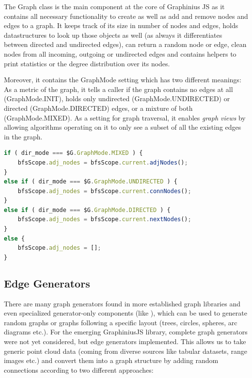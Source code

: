 	The Graph class is the main component at the core of Graphinius JS as it contains all necessary functionality to create as well as add and remove nodes and edges to a graph. It keeps track of its size in number of nodes and edges, holds datastructures to look up those objects as well (as always it differentiates between directed and undirected edges), can return a random node or edge, clean nodes from all incoming, outgoing or undirected edges and contains helpers to print statistics or the degree distribution over its nodes.
	
	Moreover, it contains the GraphMode setting which has two different meanings: As a metric of the graph, it tells a caller if the graph contains no edges at all (GraphMode.INIT), holds only undirected (GraphMode.UNDIRECTED) or directed (GraphMode.DIRECTED) edges, or a mixture of both (GraphMode.MIXED). As a setting for graph traversal, it enables \textit{graph views} by allowing algorithms operating on it to only see a subset of all the existing edges in the graph.
	
	\begin{lstlisting}[caption={Graph traveral dependent on GraphMode.}, label={lst:traversal_mode}, language=JavaScript]
if ( dir_mode === $G.GraphMode.MIXED ) {
	bfsScope.adj_nodes = bfsScope.current.adjNodes();
}
else if ( dir_mode === $G.GraphMode.UNDIRECTED ) {
	bfsScope.adj_nodes = bfsScope.current.connNodes();
}
else if ( dir_mode === $G.GraphMode.DIRECTED ) {
	bfsScope.adj_nodes = bfsScope.current.nextNodes();
}
else {
	bfsScope.adj_nodes = [];
}
	\end{lstlisting}
	
	
	\subsection{Edge Generators}
	\label{ssection: core_}
	
	There are many graph generators found in more established graph libraries and even specialized generator-only components (like \citep{bader2006gtgraph}), which can be used to generate random graphs or graphs following a specific layout (trees, circles, spheres, arc diagrams etc.). For the emerging GraphiniusJS library, complete graph generators were not yet considered, but edge generators implemented. This allows us to take generic point cloud data (coming from diverse sources like tabular datasets, range images etc.) and convert them into a graph structure by adding random connections according to two different approaches:
	
